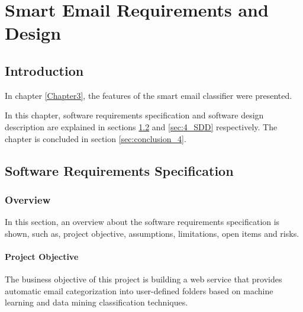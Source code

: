 \newenvironment{my_desc}
{\begin{description}
  \setlength{\itemsep}{0cm}
  \setlength{\parskip}{0cm}}
{\end{description}}

\chapter{Smart Email Requirements and Design} %

\label{Chapter4} %


\section{Introduction}
In chapter \ref{Chapter3}, the features of the smart email classifier were presented.

In this chapter, software requirements specification and software design description 
are explained in sections \ref{sec:4_SRS} and \ref{sec:4_SDD} respectively. The chapter is
concluded in section \ref{sec:conclusion_4}.

\section{Software Requirements Specification} %
\label{sec:4_SRS}
\subsection{Overview}
In this section, an overview about the software requirements specification
is shown, such as, project objective, assumptions, limitations, open items
and risks.

\subsubsection{Project Objective}
The business objective of this project is building a web service that provides
automatic email categorization into user-defined folders based on machine 
learning and data mining classification techniques.



